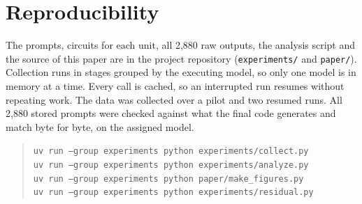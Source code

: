 \documentclass[11pt]{article}
\begin{document}
\section{Reproducibility}

The prompts, circuits for each unit, all 2{,}880 raw outputs, the analysis script and the source of this paper are in the project repository (\texttt{experiments/} and \texttt{paper/}). Collection runs in stages grouped by the executing model, so only one model is in memory at a time. Every call is cached, so an interrupted run resumes without repeating work. The data was collected over a pilot and two resumed runs. All 2{,}880 stored prompts were checked against what the final code generates and match byte for byte, on the assigned model.

\begin{quote}\small
\texttt{uv run --group experiments python experiments/collect.py}\\
\texttt{uv run --group experiments python experiments/analyze.py}\\
\texttt{uv run --group experiments python paper/make\_figures.py}\\
\texttt{uv run --group experiments python experiments/residual.py}
\end{quote}
\end{document}
